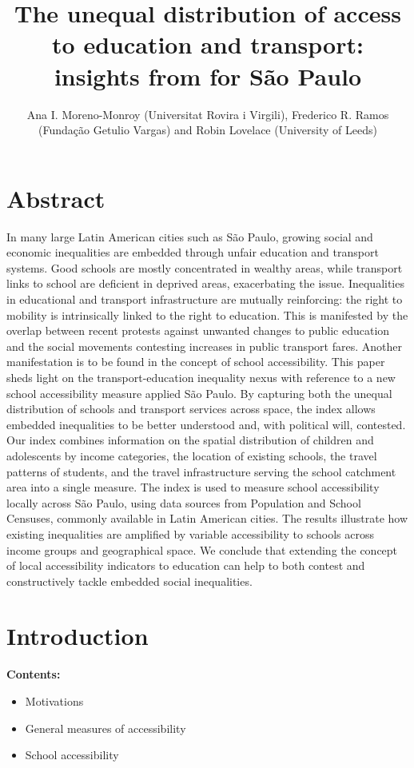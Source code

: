 \documentclass[]{article}
\title{The unequal distribution of access to education and transport: insights
from for São Paulo}
\author{Ana I. Moreno-Monroy (Universitat Rovira i Virgili), Frederico R. Ramos
(Fundação Getulio Vargas) and Robin Lovelace (University of Leeds)}
\date{}
\begin{document}
\maketitle


\section{Abstract}\label{abstract}

In many large Latin American cities such as São Paulo, growing social
and economic inequalities are embedded through unfair education and
transport systems. Good schools are mostly concentrated in wealthy
areas, while transport links to school are deficient in deprived areas,
exacerbating the issue. Inequalities in educational and transport
infrastructure are mutually reinforcing: the right to mobility is
intrinsically linked to the right to education. This is manifested by
the overlap between recent protests against unwanted changes to public
education and the social movements contesting increases in public
transport fares. Another manifestation is to be found in the concept of
school accessibility. This paper sheds light on the transport-education
inequality nexus with reference to a new school accessibility measure
applied São Paulo. By capturing both the unequal distribution of schools
and transport services across space, the index allows embedded
inequalities to be better understood and, with political will,
contested. Our index combines information on the spatial distribution of
children and adolescents by income categories, the location of existing
schools, the travel patterns of students, and the travel infrastructure
serving the school catchment area into a single measure. The index is
used to measure school accessibility locally across São Paulo, using
data sources from Population and School Censuses, commonly available in
Latin American cities. The results illustrate how existing inequalities
are amplified by variable accessibility to schools across income groups
and geographical space. We conclude that extending the concept of local
accessibility indicators to education can help to both contest and
constructively tackle embedded social inequalities.

\section{Introduction}\label{introduction}

\textbf{Contents:}

\begin{itemize}
\itemsep1pt\parskip0pt
\item
  Motivations
\item
  General measures of accessibility
\item
  School accessibility
\end{itemize}
\end{document}
